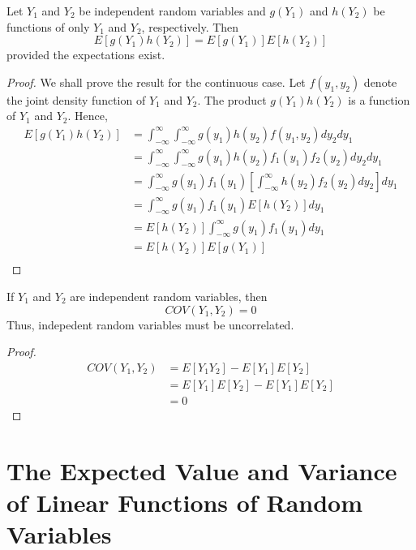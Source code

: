 \documentclass[12pt, a4paper, twoside, openright, titlepage]{book}
\begin{document}
\begin{thm}{}{}
    Let $Y_1$ and $Y_2$ be independent random variables and $g(Y_1)$ and $h(Y_2)$ be functions of only $Y_1$ and $Y_2$, respectively. Then \begin{equation*}
        E[g(Y_1)h(Y_2)] = E[g(Y_1)]E[h(Y_2)]
    \end{equation*}
    provided the expectations exist.
\end{thm}
\begin{proof}{}{}
    We shall prove the result for the continuous case. Let $f(y_1,y_2)$ denote the joint density function of $Y_1$ and $Y_2$. The product $g(Y_1)h(Y_2)$ is a function of $Y_1$ and $Y_2$. Hence, \begin{align*}
        E[g(Y_1)h(Y_2)] &= \int_{-\infty}^{\infty}\int_{-\infty}^{\infty}g(y_1)h(y_2)f(y_1,y_2)dy_2dy_1 \\
        &= \int_{-\infty}^{\infty}\int_{-\infty}^{\infty}g(y_1)h(y_2)f_1(y_1)f_2(y_2)dy_2dy_1 \\
        &= \int_{-\infty}^{\infty}g(y_1)f_1(y_1)\left[\int_{-\infty}^{\infty}h(y_2)f_2(y_2)dy_2\right]dy_1 \\
        &= \int_{-\infty}^{\infty}g(y_1)f_1(y_1)E[h(Y_2)]dy_1 \\
        &= E[h(Y_2)]\int_{-\infty}^{\infty}g(y_1)f_1(y_1)dy_1 \\
        &= E[h(Y_2)]E[g(Y_1)] \\
    \end{align*}
\end{proof}


\begin{thm}{}{}
    If $Y_1$ and $Y_2$ are independent random variables, then \begin{equation*}
        COV(Y_1,Y_2) = 0
    \end{equation*}
    Thus, indepedent random variables must be uncorrelated.
\end{thm}
\begin{proof}{}{}
    \begin{align*}
        COV(Y_1,Y_2) &= E[Y_1Y_2] - E[Y_1]E[Y_2] \\
        &= E[Y_1]E[Y_2] -E[Y_1]E[Y_2] \\
        &= 0
    \end{align*}
\end{proof}


\section{\textsection The Expected Value and Variance of Linear Functions of Random Variables}
\end{document}
